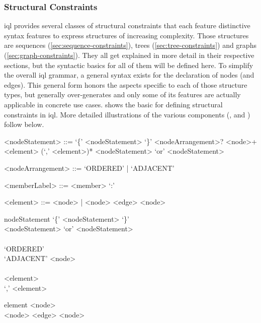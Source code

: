 \documentclass[11pt,a4paper]{article}
\begin{document}
\subsubsection{Structural Constraints}
\label{sec:structural-constraints}

\ac{iql} provides several classes of structural constraints that each feature distinctive syntax features to express structures of increasing complexity.
Those structures are sequences (\ref{sec:sequence-constraints}), trees (\ref{sec:tree-constraints}) and graphs (\ref{sec:graph-constraints}).
They all get explained in more detail in their respective sections, but the syntactic basics for all of them will be defined here.
To simplify the overall \ac{iql} grammar, a general syntax exists for the declaration of nodes (and edges).
This general form honors the aspects specific to each of those structure types, but generally over-generates and only some of its features are actually applicable in concrete use cases.
 shows the basic for defining structural constraints in \ac{iql}.
More detailed illustrations of the various components (,  and ) follow below.

\begin{gram}
	\label{gram:node-statement}
	\begin{grammar}			
		<nodeStatement> ::= `\{' <nodeStatement> `\}'
		\alt <nodeArrangement>? <node>+
		\alt <element> (`,' <element>)*
		\alt <nodeStatement> `or' <nodeStatement>
		
		<nodeArrangement> ::= `ORDERED' | `ADJACENT'
		
		<memberLabel> ::= <member> `:'
		
		<element> ::= <node> | <node> <edge> <node>
	\end{grammar}
	\diagsep
	\begin{rrdiag*}{nodeStatement}
		\sst
			`\{' <nodeStatement> `\}' \\
			<nodeStatement> `or' <nodeStatement> \\
			\sst \\ `ORDERED' \\ `ADJACENT' \est \srp <node> \\ \erp \\
			<element> \srp \\ `,' <element> \erp
		\est
	\end{rrdiag*}

	\begin{rrdiag*}{element}
		 \\ <node> <edge> <node> \est
	\end{rrdiag*}
\end{gram}
\end{document}
